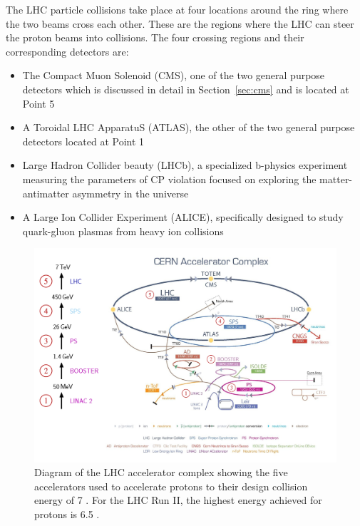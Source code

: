 The LHC particle collisions take place at four locations around the ring where the two beams
cross each other. These are the regions where the LHC can steer the proton
beams into collisions. The four crossing regions and their corresponding detectors are:
\begin{itemize}
\item The Compact Muon Solenoid (CMS), one of the two general purpose detectors which is
discussed in detail in Section~\ref{sec:cms} and is located at Point 5
\item A Toroidal LHC ApparatuS (ATLAS), the other of the two general purpose detectors
located at Point 1
\item Large Hadron Collider beauty (LHCb), a specialized b-physics experiment measuring
the parameters of CP violation focused on exploring the matter-antimatter asymmetry
in the universe
\item A Large Ion Collider Experiment (ALICE), specifically designed to study
quark-gluon plasmas from heavy ion collisions
\end{itemize}

\begin{figure}[htbp]
\centering
     \includegraphics[width=1.0\textwidth]{cms_and_lhc/plots/lhc_complex.png}
     \caption{
Diagram of the LHC accelerator complex showing the five accelerators used to accelerate
protons to their design collision energy of 7 \TeV. For the LHC Run II, the highest energy 
achieved for protons is 6.5 \TeV.
     }
     \label{fig:lhc_complex}
\end{figure}



